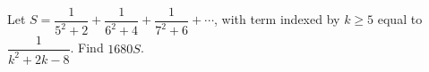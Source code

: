 Let $S=\dfrac{1}{5^2+2}+\dfrac{1}{6^2+4}+\dfrac{1}{7^2+6}+\cdots$, with term indexed by $k\ge5$ equal to $\dfrac{1}{k^2+2k-8}$. Find $1680S$.
